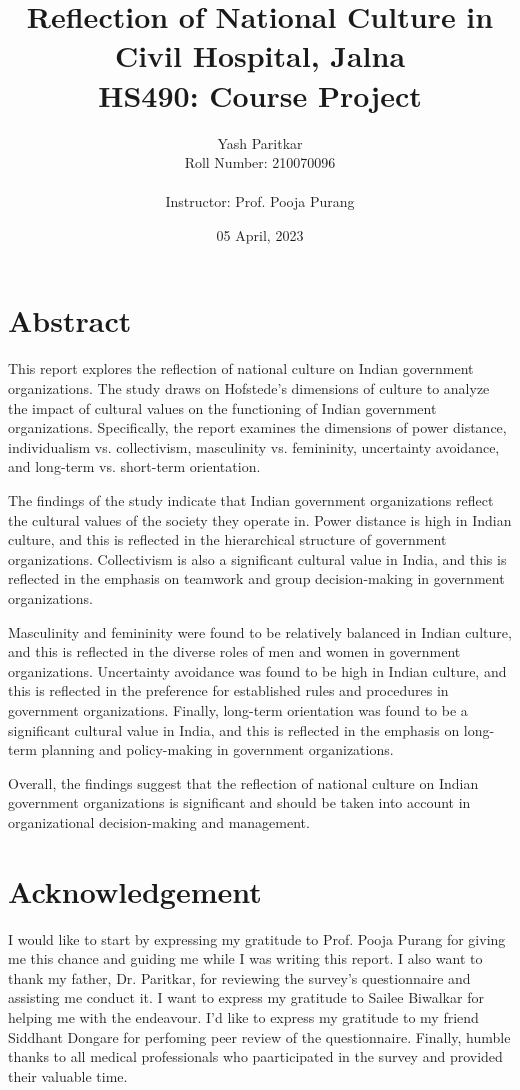 \documentclass{article}
\title{\textbf{Reflection of National Culture in Civil Hospital, Jalna}\\
HS490: Course Project}
\author{Yash Paritkar\\
Roll Number: 210070096\\
\\
Instructor: Prof. Pooja Purang}
\date{05 April, 2023}
\begin{document}
\maketitle

\newpage
\section*{Abstract}
This report explores the reflection of national culture on Indian government organizations. The study draws on Hofstede's dimensions of culture to analyze the impact of cultural values on the functioning of Indian government organizations. Specifically, the report examines the dimensions of power distance, individualism vs. collectivism, masculinity vs. femininity, uncertainty avoidance, and long-term vs. short-term orientation.

The findings of the study indicate that Indian government organizations reflect the cultural values of the society they operate in. Power distance is high in Indian culture, and this is reflected in the hierarchical structure of government organizations. Collectivism is also a significant cultural value in India, and this is reflected in the emphasis on teamwork and group decision-making in government organizations.

Masculinity and femininity were found to be relatively balanced in Indian culture, and this is reflected in the diverse roles of men and women in government organizations. Uncertainty avoidance was found to be high in Indian culture, and this is reflected in the preference for established rules and procedures in government organizations. Finally, long-term orientation was found to be a significant cultural value in India, and this is reflected in the emphasis on long-term planning and policy-making in government organizations.

Overall, the findings suggest that the reflection of national culture on Indian government organizations is significant and should be taken into account in organizational decision-making and management. %

\newpage
\section*{Acknowledgement}
I would like to start by expressing my gratitude to Prof. Pooja Purang for giving me this chance and guiding me while I was writing this report. I also want to thank my father, Dr. Paritkar, for reviewing the survey's questionnaire and assisting me conduct it. I want to express my gratitude to Sailee Biwalkar for helping me with the endeavour. I'd like to express my gratitude to my friend Siddhant Dongare for perfoming peer review of the questionnaire. Finally, humble thanks to all medical professionals who paarticipated in the survey and provided their valuable time.
\end{document}
